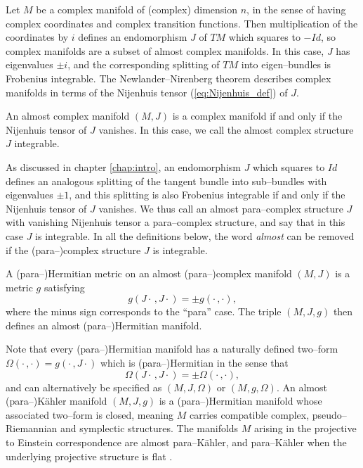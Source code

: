 Let $M$ be a complex manifold of (complex) dimension $n$, in the sense of having complex coordinates and complex transition functions. Then multiplication of the coordinates by $i$ defines an endomorphism $J$ of $TM$ which squares to $-Id$, so complex manifolds are a subset of almost complex manifolds. In this case, $J$ has eigenvalues $\pm i$, and the corresponding splitting of $TM$ into eigen--bundles is Frobenius integrable. The Newlander--Nirenberg theorem describes complex manifolds in terms of the Nijenhuis tensor (\ref{eq:Nijenhuis_def}) of $J$.

\begin{theo}[\cite{CG}]
An almost complex manifold $(M,J)$ is a complex manifold if and only if the Nijenhuis tensor of $J$ vanishes. In this case, we call the almost complex structure $J$ integrable.
\end{theo}


As discussed in chapter \ref{chap:intro}, an endomorphism $J$ which squares to $Id$ defines an analogous splitting of the tangent bundle into sub--bundles with eigenvalues $\pm 1$, and this splitting is also Frobenius integrable if and only if the Nijenhuis tensor of $J$ vanishes. We thus call an almost para--complex structure $J$ with vanishing Nijenhuis tensor a para--complex structure, and say that in this case $J$ is integrable. In all the definitions below, the word \textit{almost} can be removed if the (para--)complex structure $J$ is integrable.

\begin{defi}
A (para--)Hermitian metric on an almost (para--)complex manifold $(M,J)$ is a metric $g$ satisfying
\[
g(J\cdot\,,J\cdot) = \pm g(\cdot\,,\cdot),
\]
where the minus sign corresponds to the ``para'' case. The triple $(M,J,g)$ then defines an almost (para--)Hermitian manifold.
\end{defi}

Note that every (para--)Hermitian manifold has a naturally defined two--form $\Omega(\cdot\,,\cdot)=g(\cdot\,,J\cdot)$ which is (para--)Hermitian in the sense that
\[
\Omega(J\cdot\,,J\cdot) = \pm \Omega(\cdot\,,\cdot),
\]
and can alternatively be specified as $(M,J,\Omega)$ or $(M,g,\Omega)$. An almost (para--)K\"ahler manifold $(M,J,g)$ is a (para--)Hermitian manifold whose associated two--form is closed, meaning $M$ carries compatible complex, pseudo--Riemannian and symplectic structures. The manifolds $M$ arising in the projective to Einstein correspondence are almost para--K\"ahler, and para--K\"ahler when the underlying projective structure is flat \cite{DM}.

